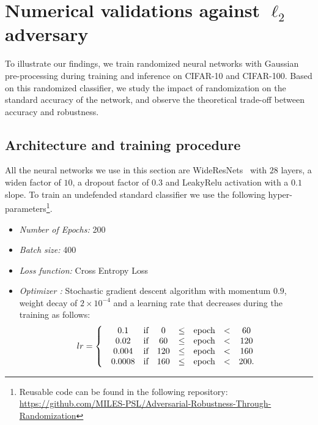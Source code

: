 \section{Numerical validations against $\ell_2$ adversary}
\label{section::Experiments}

To illustrate our findings, we train randomized neural networks with Gaussian pre-processing during training and inference on CIFAR-10 and CIFAR-100. Based on this randomized classifier, we study the impact of randomization on the standard accuracy of the network, and observe the theoretical trade-off between accuracy and robustness.


\subsection{Architecture and training procedure}
All the neural networks we use in this section are WideResNets~\citep{ZagoruykoK16} with $28$ layers, a widen factor of $10$, a dropout factor of $0.3$ and LeakyRelu activation with a $0.1$ slope. To train an undefended standard classifier we use the following hyper-parameters\footnote{Reusable code can be found in the following repository: \url{https://github.com/MILES-PSL/Adversarial-Robustness-Through-Randomization}}. 
        \begin{itemize}
            \item \textit{Number of Epochs:} 200
            \item \textit{Batch size:} 400
            \item \textit{Loss function:} Cross Entropy Loss
            \item \textit{Optimizer :} Stochastic gradient descent algorithm with momentum $0.9$, weight decay of $2\times10^{-4}$ and a learning rate that decreases during the training as follows: 
            \begin{align}
                lr = \left\{
                        \begin{matrix}
                        &0.1 & \text{if} & 0 &\leq & \text{epoch} & <& 60\\
                        &0.02 & \text{if} & 60 &\leq & \text{epoch} & <& 120\\
                        &0.004 & \text{if} & 120 &\leq & \text{epoch} & <& 160\\
                        &0.0008 & \text{if} & 160 &\leq & \text{epoch} & <& 200.\\
                        \end{matrix} \notag
                        \right.
            \end{align}
        \end{itemize}
        

